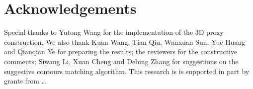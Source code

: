 

\section*{Acknowledgements}
Special thanks to Yutong Wang for the implementation of the 3D proxy construction. We also thank Kuan Wang, Tian Qiu, Wanxuan Sun, Yue Huang and Qianqian Ye for preparing the results; the reviewers for the constructive comments; Siwang Li, Xuan Cheng and Debing Zhang for suggestions on the suggestive contours matching algorithm. This research is is supported in part by grants from \ldots 